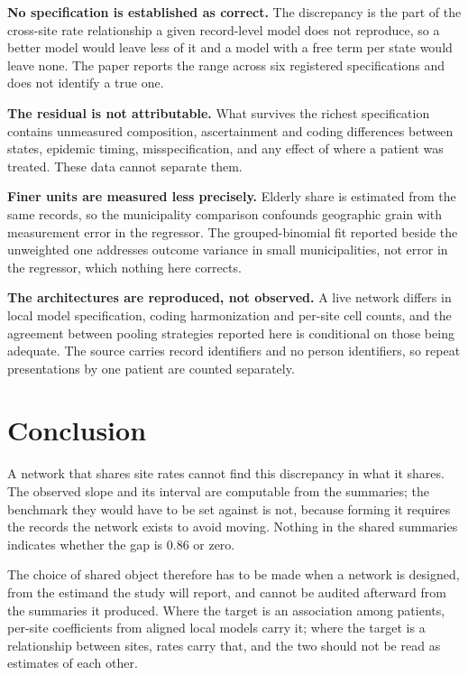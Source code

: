 \documentclass[11pt]{article}
\begin{document}
\textbf{No specification is established as correct.}  The discrepancy
is the part of the cross-site rate relationship a given record-level
model does not reproduce, so a better model would leave less of it and
a model with a free term per state would leave none.  The paper reports
the range across six registered specifications and does not identify a
true one.

\textbf{The residual is not attributable.}  What survives the richest
specification contains unmeasured composition, ascertainment and coding
differences between states, epidemic timing, misspecification, and any
effect of where a patient was treated.  These data cannot separate
them.

\textbf{Finer units are measured less precisely.}  Elderly share is
estimated from the same records, so the municipality comparison
confounds geographic grain with measurement error in the regressor.  The
grouped-binomial fit reported beside the unweighted one addresses
outcome variance in small municipalities, not error in the regressor,
which nothing here corrects.

\textbf{The architectures are reproduced, not observed.}  A live
network differs in local model specification, coding harmonization and
per-site cell counts, and the agreement between pooling strategies
reported here is conditional on those being adequate.  The source
carries record identifiers and no person identifiers, so repeat
presentations by one patient are counted separately.

\section{Conclusion}

A network that shares site rates cannot find this discrepancy in what it
shares.  The observed slope and its interval are computable from the
summaries; the benchmark they would have to be set against is not,
because forming it requires the records the network exists to avoid
moving.  Nothing in the shared summaries indicates whether the gap is
0.86 or zero.

The choice of shared object therefore has to be made when a network is
designed, from the estimand the study will report, and cannot be
audited afterward from the summaries it produced.  Where the target is
an association among patients, per-site coefficients from aligned local
models carry it; where the target is a relationship between sites,
rates carry that, and the two should not be read as estimates of each
other.
\end{document}
